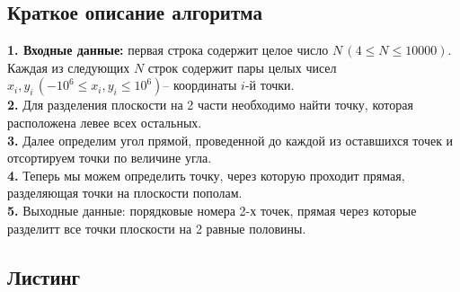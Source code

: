 \documentclass[a5paper, 10pt]{article}
\theoremstyle{definition}
\theoremstyle{plain}
\theoremstyle{remark}
\begin{document}
\subsection{Краткое описание алгоритма}
\textbf{1. Входные данные:} первая строка содержит целое число $N\, (4 \leq N \leq 10000)$. Каждая из следующих $N$ строк содержит пары целых чисел $x_i, y_i \, (-10^6 \leq x_i, y_i \leq 10^6)$-- координаты $i$-й точки. \\
\textbf{2.} Для разделения плоскости на 2 части необходимо найти точку, которая расположена левее всех остальных. \\
\textbf{3.} Далее определим угол прямой, проведенной до каждой из оставшихся точек и отсортируем точки по величине угла. \\
\textbf{4.} Теперь мы можем определить точку, через которую проходит прямая, разделяющая точки на плоскости пополам. \\
\textbf{5.} Выходные данные: порядковые номера 2-х точек, прямая через которые разделитт все точки плоскости на 2 равные половины.

\subsection{Листинг}
\end{document}
